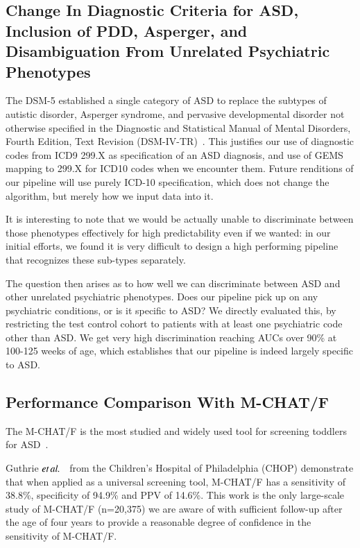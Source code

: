 \documentclass[onecolumn,,10pt]{IEEEtran}
\begin{document}
\subsection{Change In Diagnostic Criteria for ASD, Inclusion of PDD, Asperger, and Disambiguation From Unrelated Psychiatric Phenotypes}\label{subsec:otherpsych}

The DSM-5 established
a single category of ASD to replace
the subtypes of autistic disorder,
Asperger syndrome, and pervasive
developmental disorder not
otherwise specified in the Diagnostic
and Statistical Manual of Mental
Disorders, Fourth Edition, Text
Revision (DSM-IV-TR)~\cite{hyman2020identification}. This justifies our use of diagnostic codes from ICD9 299.X as specification of an ASD diagnosis, and use of GEMS mapping to 299.X for ICD10 codes when we encounter them. Future renditions of our pipeline will use purely ICD-10 specification, which does not change the algorithm, but merely how we input data into it.

 It is  interesting to note that we would be actually unable to discriminate between  those phenotypes effectively for  high predictability even if we wanted: in our initial efforts, we found it is very difficult to design a high performing pipeline that recognizes these sub-types separately.

The  question then arises as to how well we can discriminate between ASD and other unrelated psychiatric phenotypes. Does our pipeline pick up on any psychiatric conditions, or is it specific to ASD? We directly evaluated this, by restricting the test control  cohort to  patients with at least one psychiatric code other than ASD. We get very high discrimination reaching AUCs over 90\% at 100-125 weeks of age, which establishes that our pipeline is indeed largely specific to ASD.
%
\subsection{Performance Comparison With M-CHAT/F}
 The M-CHAT/F is the
most studied and widely used tool
for screening toddlers for ASD~\cite{robins2014validation,hyman2020identification}.

Guthrie $\textit{et} \mspace{3mu} \textit{al.}$~\cite{pmid31562252} from the Children's Hospital of Philadelphia (CHOP)  demonstrate that when applied as a universal screening tool, M-CHAT/F has a sensitivity of 38.8\%, specificity of 94.9\% and PPV of 14.6\%. This work is the only large-scale study of M-CHAT/F (n=20,375) we are aware of with sufficient follow-up after the age of four years to provide a reasonable degree of confidence in the sensitivity of M-CHAT/F.
\end{document}
